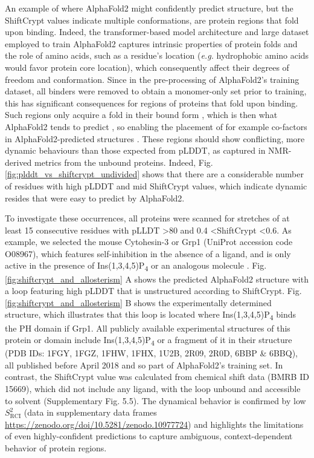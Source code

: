 An example of where AlphaFold2 might confidently predict structure, but the ShiftCrypt values indicate multiple conformations, are protein regions that fold upon binding. Indeed, the transformer-based model architecture and large dataset employed to train AlphaFold2 captures intrinsic properties of protein folds and the role of amino acids, such as a residue's location (\textit{e.g.} hydrophobic amino acids would favor protein core location), which consequently affect their degrees of freedom and conformation. Since in the pre-processing of AlphaFold2's training dataset, all binders were removed to obtain a monomer-only set prior to training, this has significant consequences for regions of proteins that fold upon binding. Such regions only acquire a fold in their bound form \cite{robustelli_mechanism_2020}, which is then what AlphaFold2 tends to predict \cite{saldano_impact_2022}, so enabling the placement of for example co-factors in AlphaFold2-predicted structures \cite{hekkelman_alphafill_2023}. These regions should show conflicting, more dynamic behaviours than those expected from pLDDT, as captured in NMR-derived metrics from the unbound proteins. Indeed, Fig. \ref{fig:plddt_vs_shiftcrypt_undivided} shows that there are a considerable number of residues with high pLDDT and mid ShiftCrypt values, which indicate dynamic resides that were easy to predict by AlphaFold2. 

To investigate these occurrences, all proteins were scanned for stretches of at least 15 consecutive residues with pLLDT \textgreater 80 and 0.4 \textless ShiftCrypt \textless 0.6. As example, we selected the mouse Cytohesin-3 or Grp1 (UniProt accession code O08967), which features self-inhibition in the absence of a ligand, and is only active in the presence of Ins(1,3,4,5)P\textsubscript{4} or an analogous molecule \cite{dinitto_structural_2007}. Fig. \ref{fig:shiftcrypt_and_allosterism} A shows the predicted AlphaFold2 structure with a loop featuring high pLDDT that is unstructured according to ShiftCrypt. Fig. \ref{fig:shiftcrypt_and_allosterism} B shows the experimentally determined structure, which illustrates that this loop is located where Ins(1,3,4,5)P\textsubscript{4} binds the PH domain if Grp1. All publicly available experimental structures of this protein or domain include Ins(1,3,4,5)P\textsubscript{4} or a fragment of it in their structure (PDB IDs: 1FGY, 1FGZ, 1FHW, 1FHX, 1U2B, 2R09, 2R0D, 6BBP \& 6BBQ), all published before April 2018 and so part of AlphaFold2's training set. In contrast, the ShiftCrypt value was calculated from chemical shift data (BMRB ID 15669), which did not include any ligand, with the loop unbound and accessible to solvent (Supplementary Fig. 5.5).
The dynamical behavior is confirmed by low \(S^{2}_{\text{RCI}}\) (data in supplementary data frames \url{https://zenodo.org/doi/10.5281/zenodo.10977724}) and highlights the limitations of even highly-confident predictions to capture ambiguous, context-dependent behavior of protein regions.

